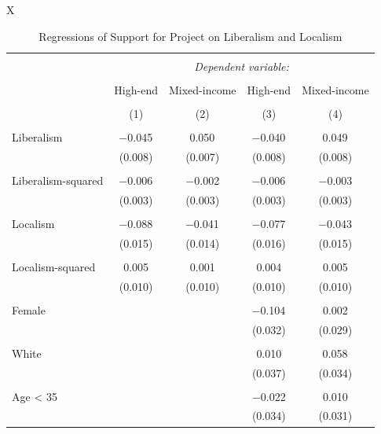 \documentclass[article,11pt]{memoir}
\begin{document}
\begin{table}
  \caption{Regressions of Support for Project on Liberalism and Localism}
  \label{tab:e_support_regression}
  \begin{threeparttable}
  \scriptsize
  \begin{tabularx}{\linewidth}{X}
  \centering

  \begin{tabular}{@{\extracolsep{5pt}}lcccc} 
  \\[-1.8ex]\hline 
  \hline \\[-1.8ex] 
   & \multicolumn{4}{c}{\textit{Dependent variable:}} \\ 
  \cline{2-5} 
  \\[-1.8ex] & High-end & Mixed-income & High-end & Mixed-income\\ 
  \\[-1.8ex] & (1) & (2) & (3) & (4)\\ 
  \hline \\[-1.8ex] 
   Liberalism & $-$0.045$^{}$ & 0.050$^{}$ & $-$0.040$^{}$ & 0.049$^{}$ \\ 
    & (0.008) & (0.007) & (0.008) & (0.008) \\ 
    & & & & \\ 
   Liberalism-squared & $-$0.006$^{}$ & $-$0.002 & $-$0.006$^{}$ & $-$0.003 \\ 
    & (0.003) & (0.003) & (0.003) & (0.003) \\ 
    & & & & \\ 
   Localism & $-$0.088$^{}$ & $-$0.041$^{}$ & $-$0.077$^{}$ & $-$0.043$^{}$ \\ 
    & (0.015) & (0.014) & (0.016) & (0.015) \\ 
    & & & & \\ 
   Localism-squared & 0.005 & 0.001 & 0.004 & 0.005 \\ 
    & (0.010) & (0.010) & (0.010) & (0.010) \\ 
    & & & & \\ 
   Female &  &  & $-$0.104$^{}$ & 0.002 \\ 
    &  &  & (0.032) & (0.029) \\ 
    & & & & \\ 
   White &  &  & 0.010 & 0.058$^{}$ \\ 
    &  &  & (0.037) & (0.034) \\ 
    & & & & \\ 
   Age < 35 &  &  & $-$0.022 & 0.010 \\ 
    &  &  & (0.034) & (0.031) \\ 

\end{tabular}
\end{tabularx}
\end{threeparttable}
\end{table}
\end{document}
